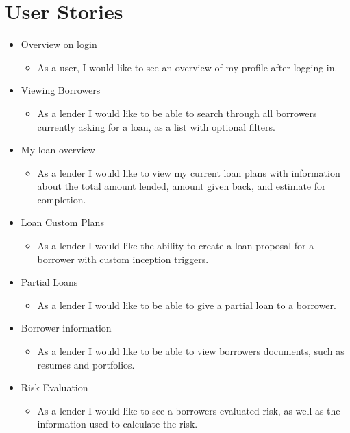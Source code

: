 \newpage
\section{User Stories}

\begin{itemize}
	\item Overview on login
	\begin{itemize}
		\item As a user, I would like to see an overview of my profile after logging in.
	\end{itemize}

	\item Viewing Borrowers
	\begin{itemize}
		\item As a lender I would like to be able to search through all borrowers currently asking for a loan, as a list with optional filters.
	\end{itemize}

	\item My loan overview
	\begin{itemize}
		\item As a lender I would like to view my current loan plans with information about the total amount lended, amount given back, and estimate for completion.
	\end{itemize}

	\item Loan Custom Plans
	\begin{itemize}
		\item As a lender I would like the ability to create a loan proposal for a borrower with custom inception triggers.
	\end{itemize}

	\item Partial Loans
	\begin{itemize}
		\item As a lender I would like to be able to give a partial loan to a borrower.
	\end{itemize}

	\item Borrower information
	\begin{itemize}
		\item As a lender I would like to be able to view borrowers documents, such as resumes and portfolios.
	\end{itemize}

	\item Risk Evaluation
	\begin{itemize}
		\item As a lender I would like to see a borrowers evaluated risk, as well as the information used to calculate the risk.
	\end{itemize}


\end{itemize}
